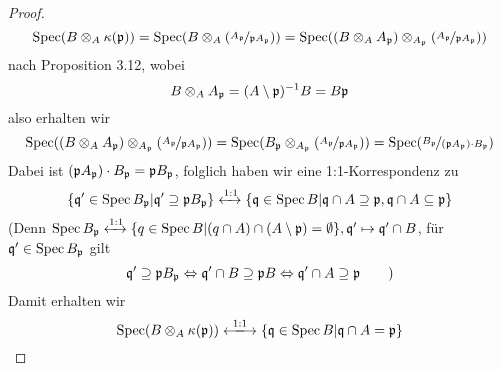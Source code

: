 \documentclass[12pt,a4paper]{scrartcl}
\theoremstyle{cplain}
\theoremstyle{cdef}
\begin{document}
\begin{proof}
	$$\Spec(B\otimes_A\kappa(\fp)) = \Spec(B\otimes_A(\fak{A_{\fp}}{\fp A_{\fp}})) = \Spec((B\otimes_A A_{\fp}) \otimes_{A_{\fp}}(\fak{A_{\fp}}{\fp A_{\fp}}))$$
	nach Proposition 3.12, wobei
	$$B\otimes_A A_{\fp} = (A\setminus \fp)^{-1}B = B\fp$$
	also erhalten wir
	$$\Spec((B\otimes_A A_{\fp}) \otimes_{A_{\fp}}(\fak{A_{\fp}}{\fp A_{\fp}})) = \Spec(B_{\fp}\otimes_{A_{\fp}}(\fak{A_{\fp}}{\fp A_{\fp}})) = \Spec(\fak{B_{\fp}}{(\fp A_{\fp})\cdot B_{\fp}})$$
	Dabei ist $(\fp A_{\fp})\cdot B_{\fp} = \fp B_{\fp}$, folglich haben wir eine 1:1-Korrespondenz zu
	$$\{\fq'\in \Spec B_{\fp}|\fq'\supseteq \fp B_{\fp}\} \xleftrightarrow{1:1} \{\fq \in \Spec B|\fq\cap A \supseteq \fp, \fq \cap A \subseteq \fp\}$$
	(Denn $\Spec B_{\fp} \xleftrightarrow{1:1} \{q\in \Spec B| (q\cap A)\cap(A\setminus \fp) = \emptyset\} , \fq'\mapsto \fq'\cap B$, für $\fq' \in \Spec B_{\fp}$ gilt
	$$\fq' \supseteq \fp B_{\fp} \Leftrightarrow \fq'\cap B \supseteq \fp B \Leftrightarrow \fq' \cap A \supseteq \fp \qquad \text{)}$$
	Damit erhalten wir
	$$\Spec(B\otimes_A\kappa(\fp)) \xlongleftrightarrow{1:1} \{\fq\in \Spec B|\fq\cap  A = \fp\}$$
\end{proof}
\end{document}
